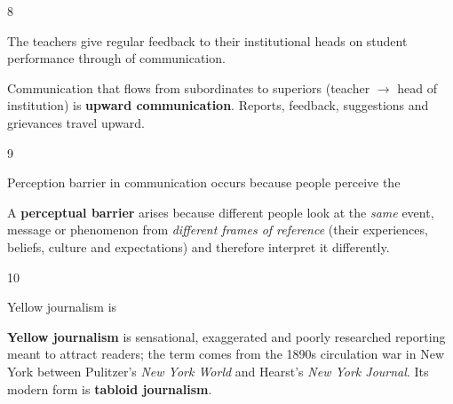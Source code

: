 \begin{question}{8}
{The teachers give regular feedback to their institutional heads on student performance through \blank{} of communication.\par}
\begin{explain}
Communication that flows from subordinates to superiors (teacher $\rightarrow$ head of institution) is \textbf{upward communication}. Reports, feedback, suggestions and grievances travel upward.
\end{explain}
\end{question}

\begin{question}{9}
{Perception barrier in communication occurs because people perceive the\par}
\begin{explain}
A \textbf{perceptual barrier} arises because different people look at the \emph{same} event, message or phenomenon from \emph{different frames of reference} (their experiences, beliefs, culture and expectations) and therefore interpret it differently.
\end{explain}
\end{question}

\begin{question}{10}
{Yellow journalism is\par}
\begin{explain}
\textbf{Yellow journalism} is sensational, exaggerated and poorly researched reporting meant to attract readers; the term comes from the 1890s circulation war in New York between Pulitzer's \emph{New York World} and Hearst's \emph{New York Journal}. Its modern form is \textbf{tabloid journalism}.
\end{explain}
\end{question}

